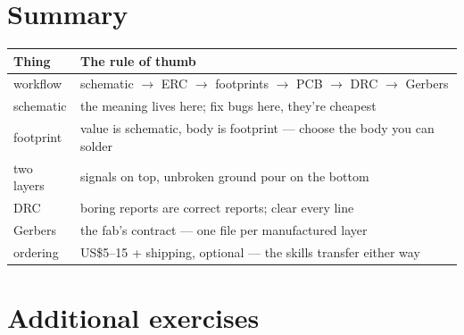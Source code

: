 \section{Summary}\label{sec:sum18}

\begin{center}
\begin{tabularx}{\linewidth}{@{}lX@{}}
\toprule
\textbf{Thing} & \textbf{The rule of thumb}\\
\midrule
workflow & schematic $\to$ ERC $\to$ footprints $\to$ PCB $\to$ DRC
$\to$ Gerbers\\
schematic & the meaning lives here; fix bugs here, they're cheapest\\
footprint & value is schematic, body is footprint --- choose the
body you can solder\\
two layers & signals on top, unbroken ground pour on the bottom\\
DRC & boring reports are correct reports; clear every line\\
Gerbers & the fab's contract --- one file per manufactured layer\\
ordering & US\$5--15 + shipping, optional --- the skills transfer
either way\\
\bottomrule
\end{tabularx}
\end{center}

\section*{Additional exercises}

